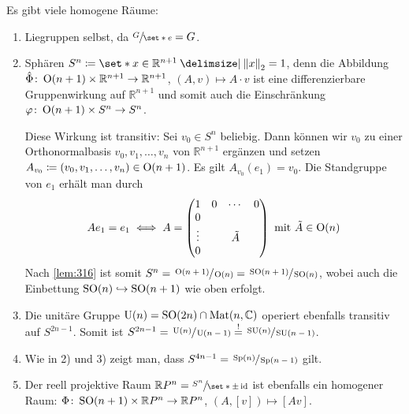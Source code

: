 \begin{beispiel*}[{name=[homogene Räume]}]
	Es gibt viele homogene Räume:
	\begin{enumerate}[1)]
		\item Liegruppen selbst, da $\sfrac{G}{\set*{e}} =G$.
		\item Sphären $S^n \coloneqq \set*{x \in \mathbb{R}^{n+1} \given \norm*{x}_2=1}$, denn die Abbildung $\hat{\Phi} \colon \operatorname{O}(n+1) \times \mathbb{R}^{n+1} \to \mathbb{R}^{n+1}$, $(A,v) \mapsto A \cdot v$ ist eine differenzierbare Gruppenwirkung auf $\mathbb{R}^{n+1}$ und somit auch die Einschränkung $\varphi \colon \operatorname{O}(n+1) \times S^n \to S^n$.
		
		Diese Wirkung ist transitiv: Sei $v_0 \in S^n$ beliebig.
		Dann können wir $v_0$ zu einer Orthonormalbasis $v_0,v_1, \ldots ,v_n$ von $\mathbb{R}^{n+1}$ ergänzen und setzen $A_{v_0} \coloneqq (v_0,v_1, \ldots , v_n) \in \operatorname{O}(n+1)$.
		Es gilt $A_{v_0}(e_1) = v_0$.
		Die Standgruppe von $e_1$ erhält man durch
		\[
			A e_1 = e_1 \iff A = \begin{pmatrix}
				1 & 0 & \cdots & 0 \\
				0 & & & \\
				\vdots & & \tilde{A} & \\
				0 & & & 
			\end{pmatrix} \text{ mit } \tilde{A} \in \operatorname{O}(n)
		\]
		Nach \autoref{lem:316} ist somit $S^n = \sfrac{\operatorname{O}(n+1)}{\operatorname{O}(n)} = \sfrac{\operatorname{SO}(n+1)}{\operatorname{SO}(n)}$, wobei auch die Einbettung $\operatorname{SO}(n) \hookrightarrow \operatorname{SO}(n+1)$ wie oben erfolgt.
		\item Die unitäre Gruppe $\operatorname{U}(n) = \operatorname{SO}(2n) \cap \operatorname{Mat}(n,\mathbb{C})$ operiert ebenfalls transitiv auf $S^{2n-1}$.
		Somit ist $S^{2n-1} = \sfrac{\operatorname{U}(n)}{\operatorname{U}(n-1)} \stackrel{!}{=} \sfrac{\operatorname{SU}(n)}{\operatorname{SU}(n-1)}$.
		\item Wie in 2) und 3) zeigt man, dass
		\(
			S^{4n-1} = \sfrac{\operatorname{Sp}(n)}{\operatorname{Sp}(n-1)}
		\) gilt.
		\item Der reell projektive Raum $\mathbb{R}P^n = \sfrac{S^n}{\set*{\pm \id}}$ ist ebenfalls ein homogener Raum: $\Phi \colon \operatorname{SO}(n+1) \times \mathbb{R}P^n \to \mathbb{R}P^n$, $(A,[v]) \mapsto [Av]$.
		

\end{enumerate}
\end{beispiel*}
